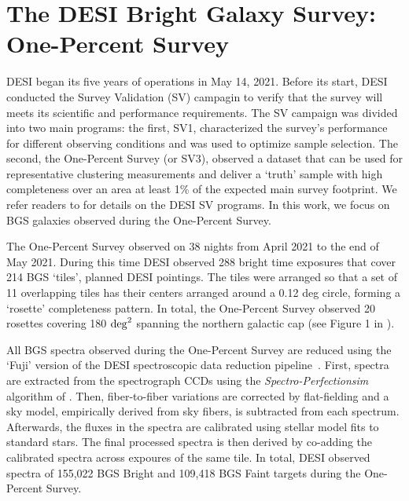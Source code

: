 \section{The DESI Bright Galaxy Survey: One-Percent Survey}  \label{sec:edr}
DESI began its five years of operations in May 14, 2021. 
Before its start, DESI conducted the Survey Validation (SV) campagin to verify
that the survey will meets its scientific and performance
requirements. 
The SV campaign was divided into two main programs: the first, SV1,
characterized the survey's performance for different observing conditions and
was used to optimize sample selection. 
The second, the One-Percent Survey (or SV3), observed a dataset that can be
used for representative clustering measurements and deliver a ‘truth’ sample
with high completeness over an area at least 1\% of the expected main survey
footprint.
We refer readers to \cite{sv_paper} for details on the DESI SV programs.
In this work, we focus on BGS galaxies observed during the One-Percent Survey.

The One-Percent Survey observed on 38 nights from April 2021 to the end of 
May 2021.
During this time DESI observed 288 bright time exposures that cover 214 BGS
`tiles', planned DESI pointings. 
The tiles were arranged so that a set of 11 overlapping tiles has their centers 
arranged around a 0.12 deg circle, forming a ‘rosette’ completeness pattern. 
In total, the One-Percent Survey observed 20 rosettes covering 180 
${\rm deg}^2$ spanning the northern galactic cap (see Figure 1 in
\citealt{hahn2022}).  

All BGS spectra observed during the One-Percent Survey are reduced using the
`Fuji' version of the DESI spectroscopic data reduction
pipeline~\citep{guy2022}. 
First, spectra are extracted from the spectrograph CCDs using the 
{\em Spectro-Perfectionsim} algorithm of \cite{bolton2010}.
Then, fiber-to-fiber variations are corrected by flat-fielding and a sky model,
empirically derived from sky fibers, is subtracted from each spectrum.
Afterwards, the fluxes in the spectra are calibrated using stellar model fits
to standard stars. 
The final processed spectra is then derived by co-adding the calibrated spectra
across expoures of the same tile. 
In total, DESI observed spectra of 155,022 BGS Bright and 109,418 BGS Faint 
targets during the One-Percent Survey. 

